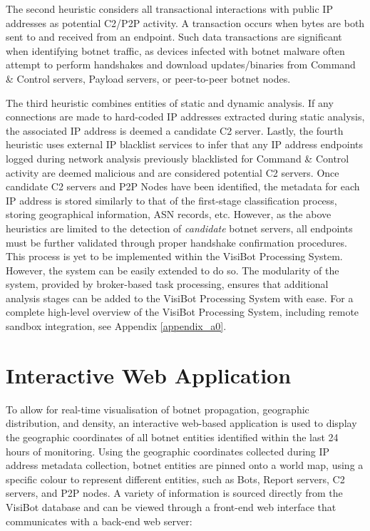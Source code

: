 The second heuristic considers all transactional interactions with public IP addresses as potential C2/P2P activity. A transaction occurs when bytes are both sent to and received from an endpoint. Such data transactions are significant when identifying botnet traffic, as devices infected with botnet malware often attempt to perform handshakes and download updates/binaries from Command \& Control servers, Payload servers, or peer-to-peer botnet nodes.

The third heuristic combines entities of static and dynamic analysis. If any connections are made to hard-coded IP addresses extracted during static analysis, the associated IP address is deemed a candidate C2 server. Lastly, the fourth heuristic uses external IP blacklist services to infer that any IP address endpoints logged during network analysis previously blacklisted for Command \& Control activity are deemed malicious and are considered potential C2 servers. Once candidate C2 servers and P2P Nodes have been identified, the metadata for each IP address is stored similarly to that of the first-stage classification process, storing geographical information, ASN records, etc. However, as the above heuristics are limited to the detection of \textit{candidate} botnet servers, all endpoints must be further validated through proper handshake confirmation procedures. This process is yet to be implemented within the VisiBot Processing System. However, the system can be easily extended to do so. The modularity of the system, provided by broker-based task processing, ensures that additional analysis stages can be added to the VisiBot Processing System with ease. For a complete high-level overview of the VisiBot Processing System, including remote sandbox integration, see Appendix \ref{appendix_a0}.


\section{Interactive Web Application}

To allow for real-time visualisation of botnet propagation, geographic distribution, and density, an interactive web-based application is used to display the geographic coordinates of all botnet entities identified within the last 24 hours of monitoring. Using the geographic coordinates collected during IP address metadata collection, botnet entities are pinned onto a world map, using a specific colour to represent different entities, such as Bots, Report servers, C2 servers, and P2P nodes. A variety of information is sourced directly from the VisiBot database and can be viewed through a front-end web interface that communicates with a back-end web server:

